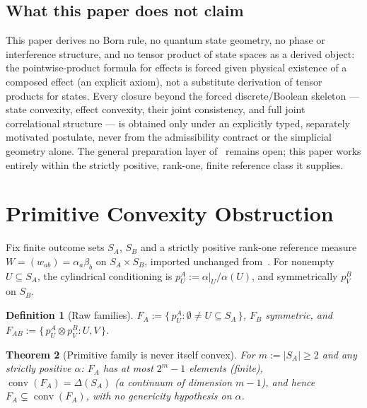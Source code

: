 \documentclass[11pt,a4paper]{article}
\newtheorem{theorem}{Theorem}[section]
\newtheorem{definition}[theorem]{Definition}
\newcommand{\SA}{S_A}
\newcommand{\SB}{S_B}
\newcommand{\FA}{F_A}
\newcommand{\FB}{F_B}
\newcommand{\FAB}{F_{AB}}
\newcommand{\conv}{\operatorname{conv}}
\newcommand{\abs}[1]{\lvert #1 \rvert}
\begin{document}
  \subsection{What this paper does not claim}
    \label{ssec:nonclaims}

    This paper derives no Born rule, no quantum state geometry, no phase or interference structure, and no
    tensor product of state spaces as a derived object: the pointwise-product formula for effects is forced
    given physical existence of a composed effect (an explicit axiom), not a substitute derivation of tensor
    products for states.
    Every closure beyond the forced discrete/Boolean skeleton --- state convexity, effect convexity, their
    joint consistency, and full joint correlational structure --- is obtained only under an explicitly typed,
    separately motivated postulate, never from the admissibility contract or the simplicial geometry alone.
    The general preparation layer of~\cite{Beau2026esub} remains open; this paper works entirely within the
    strictly positive, rank-one, finite reference class it supplies.

  \section{Primitive Convexity Obstruction}
  \label{sec:cv}

    Fix finite outcome sets $\SA$, $\SB$ and a strictly positive rank-one reference measure
    $W = (w_{ab}) = \alpha_a \beta_b$ on $\SA \times \SB$, imported unchanged from~\cite{Beau2026esub}.
    For nonempty $U \subseteq \SA$, the cylindrical conditioning is
    $p_U^A := \alpha|_U / \alpha(U)$, and symmetrically $p_V^B$ on $\SB$.

    \begin{definition}[Raw families]
      \label{def:raw}
      $\FA := \{\, p_U^A : \emptyset \neq U \subseteq \SA \,\}$, $\FB$ symmetric, and
      $\FAB := \{\, p_U^A \otimes p_V^B : U, V \,\}$.
    \end{definition}

    \begin{theorem}[Primitive family is never itself convex]
      \label{thm:cv1}
      For $m := \abs{\SA} \geq 2$ and any strictly positive $\alpha$: $\FA$ has at most $2^m - 1$ elements
      (finite), $\conv(\FA) = \Delta(\SA)$ (a continuum of dimension $m - 1$), and hence
      $\FA \subsetneq \conv(\FA)$, with no genericity hypothesis on $\alpha$.
    \end{theorem}
\end{document}
